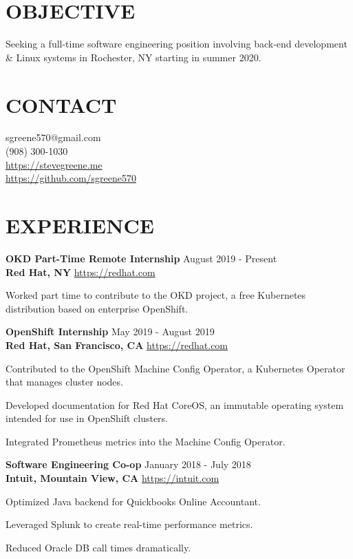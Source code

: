 \documentclass[line, margin, 11pt]{res}
\begin{document}

\begin{resume}

\section{\small OBJECTIVE}
Seeking a full-time software engineering position involving back-end development
    \& Linux systems in Rochester, NY starting in summer 2020.

\section{\small CONTACT}
sgreene570@gmail.com \\
(908) 300-1030 \\
\url{https://stevegreene.me} \\
\url{https://github.com/sgreene570}

\section{\small EXPERIENCE}
{\bf \large{OKD Part-Time Remote Internship}} \hfill August 2019 - Present \\
{\bf Red Hat, NY} \hfill \url{https://redhat.com}
\begin{compactitem}
    \item Worked part time to contribute to the OKD project, a free Kubernetes distribution based on enterprise OpenShift.
\end{compactitem}


{\bf \large{OpenShift Internship}} \hfill May 2019 - August 2019 \\
{\bf Red Hat, San Francisco, CA} \hfill \url{https://redhat.com}
\begin{compactitem}
    \item Contributed to the OpenShift Machine Config Operator, a Kubernetes Operator that manages cluster nodes.
    \item Developed documentation for Red Hat CoreOS, an immutable operating system intended for use in OpenShift clusters.
    \item Integrated Prometheus metrics into the Machine Config Operator.
\end{compactitem}


{\bf \large{Software Engineering Co-op}} \hfill January 2018 - July 2018 \\
{\bf Intuit, Mountain View, CA} \hfill \url{https://intuit.com}
\begin{compactitem}
    \item Optimized Java backend for Quickbooks Online Accountant.
    \item Leveraged Splunk to create real-time performance metrics.
    \item Reduced Oracle DB call times dramatically.
\end{compactitem}


\end{resume}
\end{document}
